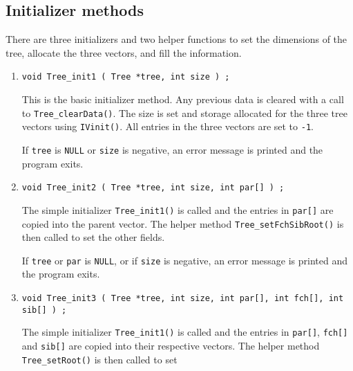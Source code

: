\subsection{Initializer methods}
\label{subsection:Tree:proto:initializers}
\par
There are three initializers and two helper functions to set the
dimensions of the tree, allocate the three vectors, and fill the
information.
\par
\begin{enumerate}
\item
\begin{verbatim}
void Tree_init1 ( Tree *tree, int size ) ;
\end{verbatim}
This is the basic initializer method.
Any previous data is cleared with a call to {\tt Tree\_clearData()}. 
The size is set and storage allocated for
the three tree vectors using {\tt IVinit()}.
All entries in the three vectors are set to {\tt -1}.
\par {}
If {\tt tree} is {\tt NULL} or {\tt size} is negative, 
an error message is printed and the program exits.
\item
\begin{verbatim}
void Tree_init2 ( Tree *tree, int size, int par[] ) ;
\end{verbatim}
The simple initializer {\tt Tree\_init1()} is called
and the entries in {\tt par[]} are copied into the parent vector.
The helper method {\tt Tree\_setFchSibRoot()} is then called to set
the other fields.
\par {}
If {\tt tree} or {\tt par} is {\tt NULL},
or if {\tt size} is negative, 
an error message is printed and the program exits.
\item
\begin{verbatim}
void Tree_init3 ( Tree *tree, int size, int par[], int fch[], int sib[] ) ;
\end{verbatim}
The simple initializer {\tt Tree\_init1()} is called
and the entries in {\tt par[]}, {\tt fch[]} and {\tt sib[]} 
are copied into their respective vectors.
The helper method {\tt Tree\_setRoot()} is then called to set

\end{enumerate}
